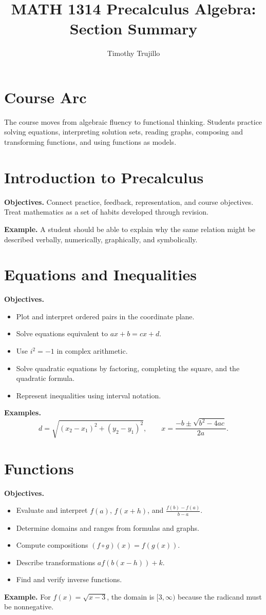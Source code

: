 \documentclass[11pt]{article}
\title{MATH 1314 Precalculus Algebra: Section Summary}
\author{Timothy Trujillo}
\date{}
\begin{document}
\maketitle

\section*{Course Arc}
The course moves from algebraic fluency to functional thinking. Students practice solving equations, interpreting solution sets, reading graphs, composing and transforming functions, and using functions as models.

\section{Introduction to Precalculus}
\textbf{Objectives.} Connect practice, feedback, representation, and course objectives. Treat mathematics as a set of habits developed through revision.

\textbf{Example.} A student should be able to explain why the same relation might be described verbally, numerically, graphically, and symbolically.

\section{Equations and Inequalities}
\textbf{Objectives.}
\begin{itemize}[noitemsep]
  \item Plot and interpret ordered pairs in the coordinate plane.
  \item Solve equations equivalent to \(ax+b=cx+d\).
  \item Use \(i^2=-1\) in complex arithmetic.
  \item Solve quadratic equations by factoring, completing the square, and the quadratic formula.
  \item Represent inequalities using interval notation.
\end{itemize}
\textbf{Examples.}
\[
d=\sqrt{(x_2-x_1)^2+(y_2-y_1)^2}, \qquad
x=\frac{-b\pm\sqrt{b^2-4ac}}{2a}.
\]

\section{Functions}
\textbf{Objectives.}
\begin{itemize}[noitemsep]
  \item Evaluate and interpret \(f(a)\), \(f(x+h)\), and \(\frac{f(b)-f(a)}{b-a}\).
  \item Determine domains and ranges from formulas and graphs.
  \item Compute compositions \((f\circ g)(x)=f(g(x))\).
  \item Describe transformations \(a f(b(x-h))+k\).
  \item Find and verify inverse functions.
\end{itemize}
\textbf{Example.} For \(f(x)=\sqrt{x-3}\), the domain is \([3,\infty)\) because the radicand must be nonnegative.
\end{document}
